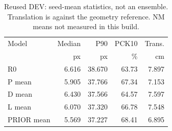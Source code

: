 \begin{table}[t]\centering\caption{Reused DEV: seed-mean statistics, not an ensemble. Translation is against the geometry reference. NM means not measured in this build.}\label{tab:accuracy}
\small\begin{tabular}{lrrrr}\toprule
Model & Median & P90 & PCK10 & Trans.\\
 & px & px & \% & cm\\\midrule
R0 & 6.616 & 38.670 & 63.73 & 7.897 \\
P mean & 5.905 & 37.766 & 67.34 & 7.153 \\
D mean & 6.430 & 37.566 & 64.57 & 7.597 \\
L mean & 6.070 & 37.320 & 66.78 & 7.548 \\
PRIOR mean & 5.569 & 37.227 & 68.41 & 6.895 \\
\bottomrule\end{tabular}\end{table}
